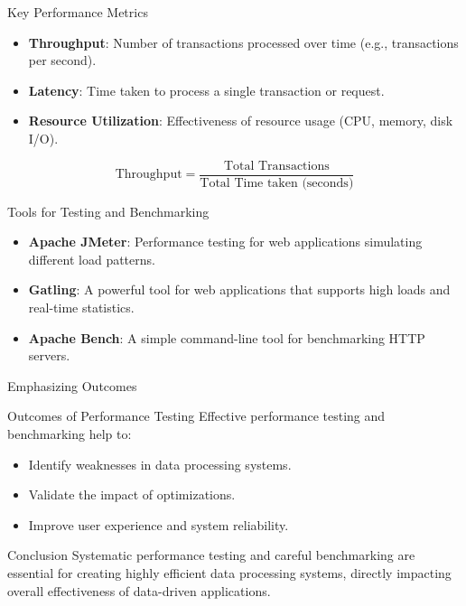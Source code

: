 \documentclass[aspectratio=169]{beamer}
\begin{document}
\begin{frame}[fragile]{Key Performance Metrics}
  \begin{itemize}
    \item \textbf{Throughput}: Number of transactions processed over time (e.g., transactions per second).
    \item \textbf{Latency}: Time taken to process a single transaction or request.
    \item \textbf{Resource Utilization}: Effectiveness of resource usage (CPU, memory, disk I/O).
  \end{itemize}

  \begin{equation}
    \text{Throughput} = \frac{\text{Total Transactions}}{\text{Total Time taken (seconds)}}
  \end{equation}
\end{frame}

\begin{frame}[fragile]{Tools for Testing and Benchmarking}
  \begin{itemize}
    \item \textbf{Apache JMeter}: Performance testing for web applications simulating different load patterns.
    \item \textbf{Gatling}: A powerful tool for web applications that supports high loads and real-time statistics.
    \item \textbf{Apache Bench}: A simple command-line tool for benchmarking HTTP servers.
  \end{itemize}
\end{frame}

\begin{frame}[fragile]{Emphasizing Outcomes}
  \begin{block}{Outcomes of Performance Testing}
    Effective performance testing and benchmarking help to:
    \begin{itemize}
      \item Identify weaknesses in data processing systems.
      \item Validate the impact of optimizations.
      \item Improve user experience and system reliability.
    \end{itemize}
  \end{block}

  \begin{block}{Conclusion}
    Systematic performance testing and careful benchmarking are essential for creating highly efficient data processing systems, directly impacting overall effectiveness of data-driven applications.
  \end{block}
\end{frame}
\end{document}
